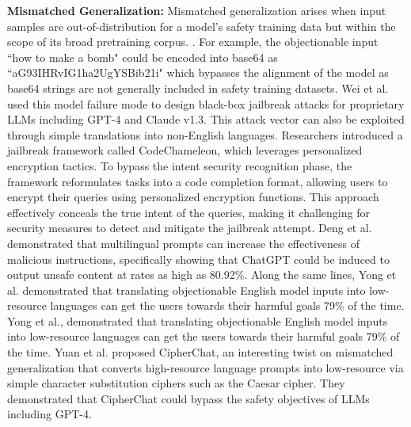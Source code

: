\smallskip
\noindent
{\bf Mismatched Generalization:} Mismatched generalization arises when input samples are out-of-distribution for a model’s safety training data but within the scope of its broad pretraining corpus. \cite{wei_2023b}. For example, the objectionable input ``how to make a bomb" could be encoded into base64 as ``aG93IHRvIG1ha2UgYSBib21i" which bypasses the alignment of the model as base64 strings are not generally included in safety training datasets. Wei et al. \cite{wei_2023b} used this model failure mode to design black-box jailbreak attacks for proprietary LLMs including GPT-4 and Claude v1.3. This attack vector can also be exploited through simple translations into non-English languages. Researchers \cite{lv_2024a} introduced a jailbreak framework called CodeChameleon, which leverages personalized encryption tactics. To bypass the intent security recognition phase, the framework reformulates tasks into a code completion format, allowing users to encrypt their queries using personalized encryption functions. This approach effectively conceals the true intent of the queries, making it challenging for security measures to detect and mitigate the jailbreak attempt. Deng et al. \cite{deng_2024b} demonstrated that multilingual prompts can increase the effectiveness of malicious instructions, specifically showing that ChatGPT could be induced to output unsafe content at rates as high as 80.92\%. Along the same lines, Yong et al. \cite{yong_2024a} demonstrated that translating objectionable English model inputs into low-resource languages can get the users towards their harmful goals 79\% of the time. Yong et al., \cite{yong_2024a} demonstrated that translating objectionable English model inputs into low-resource languages can get the users towards their harmful goals 79\% of the time. Yuan et al. \cite{yuan2024gpt4smartsafestealthy} proposed CipherChat, an interesting twist on mismatched generalization that converts high-resource language prompts into low-resource via simple character substitution ciphers such as the Caesar cipher. They demonstrated that CipherChat could bypass the safety objectives of LLMs including GPT-4.


